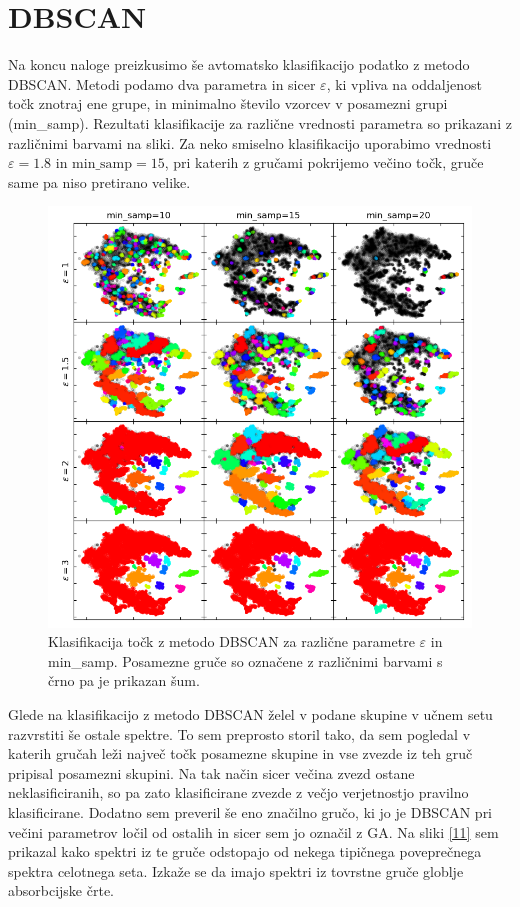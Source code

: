 \documentclass[11pt,a4paper]{article}
\begin{document}
\section{DBSCAN}

Na koncu naloge preizkusimo še avtomatsko klasifikacijo podatko z metodo DBSCAN. Metodi podamo dva parametra in sicer $\varepsilon$, ki vpliva na oddaljenost točk znotraj ene grupe, in minimalno število vzorcev v posamezni grupi (min\_samp). Rezultati klasifikacije za različne vrednosti parametra so prikazani z različnimi barvami na sliki. Za neko smiselno klasifikacijo uporabimo vrednosti $\varepsilon = 1.8$ in $\text{min\_samp}=15$, pri katerih z gručami pokrijemo večino točk, gruče same pa niso pretirano velike.

\clearpage

\begin{figure}[h]
    \centering
    \hbox{\hspace{3em}\includegraphics[scale=0.7]{DBSCAN_param}}
    \caption{Klasifikacija točk z metodo DBSCAN za različne parametre $\varepsilon$ in min\_samp. Posamezne gruče so označene z različnimi barvami s črno pa je prikazan šum.}
    \label{10}
\end{figure}

Glede na klasifikacijo z metodo DBSCAN želel v podane skupine v učnem setu razvrstiti še ostale spektre. To sem preprosto storil tako, da sem pogledal v katerih gručah leži največ točk posamezne skupine in vse zvezde iz teh gruč pripisal posamezni skupini. Na tak način sicer večina zvezd ostane neklasificiranih, so pa zato klasificirane zvezde z večjo verjetnostjo pravilno klasificirane. Dodatno sem preveril še eno značilno gručo, ki jo je DBSCAN pri večini parametrov ločil od ostalih in sicer sem jo označil z GA. Na sliki \ref{11} sem prikazal kako spektri iz te gruče odstopajo od nekega tipičnega poveprečnega spektra celotnega seta. Izkaže se da imajo spektri iz tovrstne gruče globlje absorbcijske črte.
\end{document}
